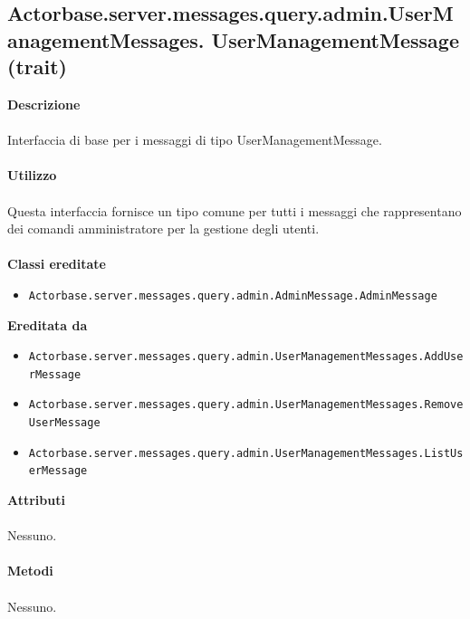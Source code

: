 \documentclass[a4paper]{article}
\begin{document}
	\subsection{Actorbase.server.messages.query.admin.UserManagementMessages.
	\newline UserManagementMessage (trait)}
		\textbf{Descrizione}
			\\ \\
			Interfaccia di base per i messaggi di tipo UserManagementMessage.
			\\ \\
		\textbf{Utilizzo}
			\\ \\
			Questa interfaccia fornisce un tipo comune per tutti i messaggi che rappresentano dei comandi amministratore per la gestione degli utenti.
			\\ \\
		\textbf{Classi ereditate}
			\begin{itemize}
				\item \texttt{Actorbase.server.messages.query.admin.AdminMessage.AdminMessage}
			\end{itemize}
		\textbf{Ereditata da}
			\begin{itemize}
				\item \texttt{Actorbase.server.messages.query.admin.UserManagementMessages.AddUserMessage}
				\item \texttt{Actorbase.server.messages.query.admin.UserManagementMessages.RemoveUserMessage}
				\item \texttt{Actorbase.server.messages.query.admin.UserManagementMessages.ListUserMessage}				
			\end{itemize}
		\textbf{Attributi}
			\\ \\
			Nessuno.
			\\ \\
		\textbf{Metodi}
			\\ \\
			Nessuno.
		
\end{document}
